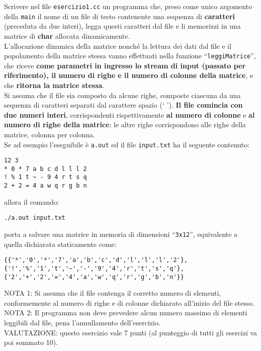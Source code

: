 
%

Scrivere nel file {\tt esercizio1.cc} un programma che, 
preso come unico argomento della \texttt{main} il nome di un file di testo
contenente una sequenza di \textbf{caratteri} (preceduta da due interi),
legga questi caratteri dal file
e li memorizzi in una matrice di \textbf{char} allocata dinamicamente.\\

L'allocazione dinamica della matrice nonch\'e la lettura dei dati dal file
e il popolamento della matrice stessa vanno effettuati nella funzione
``\texttt{leggiMatrice}'', che riceve \textbf{come parametri in ingresso
lo stream di input (passato per riferimento), il numero di righe
e il numero di colonne della matrice}, e che \textbf{ritorna la matrice stessa}.\\

Si assuma che il file sia composto da alcune righe, composte ciascuna
da una sequenza di caratteri separati dal carattere spazio (` ').
\textbf{Il file comincia con due numeri interi}, corrispondenti rispettivamente
\textbf{al numero di colonne} e \textbf{al numero di righe della matrice};
le altre righe corrispondono alle righe della matrice, colonna per colonna.\\

\noindent
Se ad esempio l'eseguibile \`e \texttt{a.out} ed il file 
\texttt{input.txt} ha il seguente contenuto:
\begin{verbatim}
12 3
* 0 * 7 a b c d l l l 2
! % 1 t ~ - 9 4 r t s q
2 + 2 = 4 a w q r g b n
\end{verbatim}
allora il comando:

\begin{verbatim}
./a.out input.txt
\end{verbatim}
\noindent
porta a salvare una matrice in memoria di dimensioni ``{\tt 3x12}'',
equivalente a quella dichiarata staticamente come:
\begin{verbatim}
{{'*','0','*','7','a','b','c','d','l','l','l','2'},
{'!','%','1','t','~','-','9','4','r','t','s','q'},
{'2','+','2','=','4','a','w','q','r','g','b','n'}}
\end{verbatim}

\vspace{.3cm}

NOTA 1:
Si assuma che il file contenga il corretto numero di elementi,
conformemente al numero di righe e di colonne dichiarato
all'inizio del file stesso.\\

NOTA 2:
Il programma non deve prevedere alcun numero massimo di elementi 
leggibili dal file, pena l'annullamento dell'esercizio.\\

VALUTAZIONE:
questo esercizio vale 7 punti (al punteggio di tutti gli esercizi va poi sommato 10).

%
